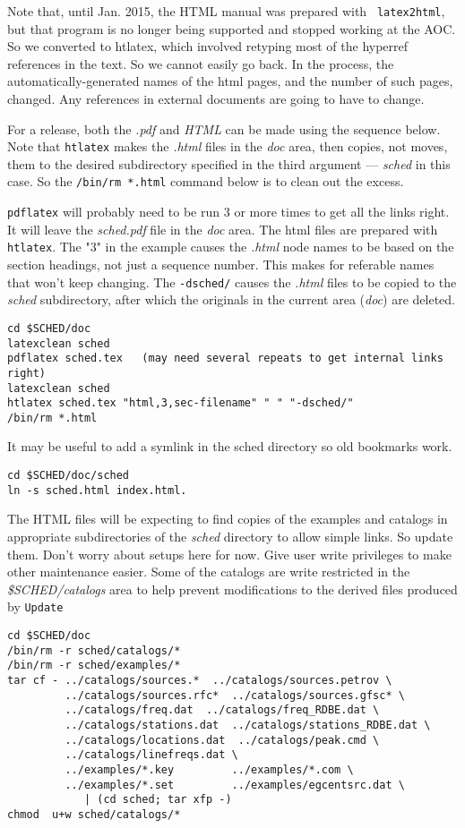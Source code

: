 \documentclass{report}
\begin{document}
\begin{description}
Note that, until Jan. 2015, the HTML manual was prepared with {\tt
latex2html}, but that program is no longer being supported and stopped
working at the AOC.  So we converted to htlatex, which involved
retyping most of the hyperref references in the text.  So we cannot
easily go back.  In the process, the automatically-generated names of
the html pages, and the number of such pages, changed.  Any references
in external documents are going to have to change.

For a release, both the {\sl .pdf} and {\sl HTML} can be made using the 
sequence below.  Note that {\tt htlatex} makes the {\sl .html} files
in the {\sl doc} area, then copies, not moves, them to the desired
subdirectory specified in the third argument --- {\sl sched} in this
case.  So the {\tt /bin/rm *.html} command below is to clean out 
the excess.

{\tt pdflatex} will probably need to be run 3 or
more times to get all the links right.  It will leave the {\sl sched.pdf} file
in the {\sl doc} area.
The html files are prepared
with {\tt htlatex}.  
The "3" in the example causes the {\sl .html} node names to be
based on the section headings, not just a sequence number.  This makes
for referable names that won't keep changing.  The {\tt -dsched/} causes
the {\sl .html} files to be copied to the {\sl sched} subdirectory, after
which the originals in the current area ({\sl doc}) are deleted.
     
\begin{verbatim}
cd $SCHED/doc
latexclean sched
pdflatex sched.tex   (may need several repeats to get internal links right)
latexclean sched
htlatex sched.tex "html,3,sec-filename" " " "-dsched/"
/bin/rm *.html
\end{verbatim}

It may be useful to add a symlink in the sched directory so old bookmarks
work.
\begin{verbatim}
cd $SCHED/doc/sched
ln -s sched.html index.html.
\end{verbatim}


The HTML files will be expecting to find copies of the examples and
catalogs in appropriate subdirectories of the {\sl sched} directory to
allow simple links.  So update them.  Don't worry about setups here
for now.  Give user write privileges to make other maintenance easier.
Some of the catalogs are write restricted in the {\sl
\$SCHED/catalogs} area to help prevent modifications to the derived
files produced by {\tt Update}

\begin{verbatim}
cd $SCHED/doc
/bin/rm -r sched/catalogs/*
/bin/rm -r sched/examples/*
tar cf - ../catalogs/sources.*  ../catalogs/sources.petrov \
         ../catalogs/sources.rfc*  ../catalogs/sources.gfsc* \
         ../catalogs/freq.dat  ../catalogs/freq_RDBE.dat \
         ../catalogs/stations.dat  ../catalogs/stations_RDBE.dat \
         ../catalogs/locations.dat  ../catalogs/peak.cmd \
         ../catalogs/linefreqs.dat \
         ../examples/*.key         ../examples/*.com \
         ../examples/*.set         ../examples/egcentsrc.dat \
            | (cd sched; tar xfp -)
chmod  u+w sched/catalogs/*
\end{verbatim}



\end{description}
\end{document}
